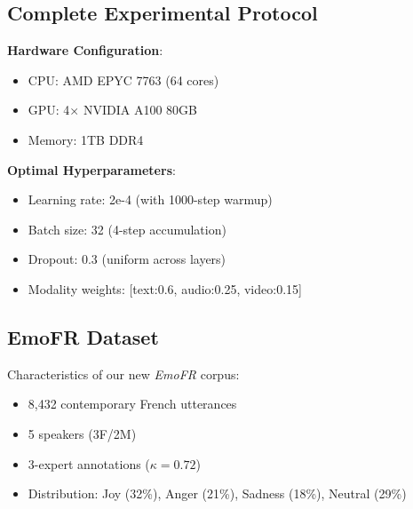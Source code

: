 \documentclass[a4paper,11pt]{article}
\begin{document}
\subsection{Complete Experimental Protocol}

\textbf{Hardware Configuration}:
\begin{itemize}
\item CPU: AMD EPYC 7763 (64 cores)
\item GPU: 4× NVIDIA A100 80GB
\item Memory: 1TB DDR4
\end{itemize}

\textbf{Optimal Hyperparameters}:
\begin{itemize}
\item Learning rate: 2e-4 (with 1000-step warmup)
\item Batch size: 32 (4-step accumulation)
\item Dropout: 0.3 (uniform across layers)
\item Modality weights: [text:0.6, audio:0.25, video:0.15]
\end{itemize}

\subsection{EmoFR Dataset}

Characteristics of our new \textit{EmoFR} corpus:
\begin{itemize}
\item 8,432 contemporary French utterances
\item 5 speakers (3F/2M)
\item 3-expert annotations ($\kappa=0.72$)
\item Distribution: Joy (32\%), Anger (21\%), Sadness (18\%), Neutral (29\%)
\end{itemize}
\end{document}
